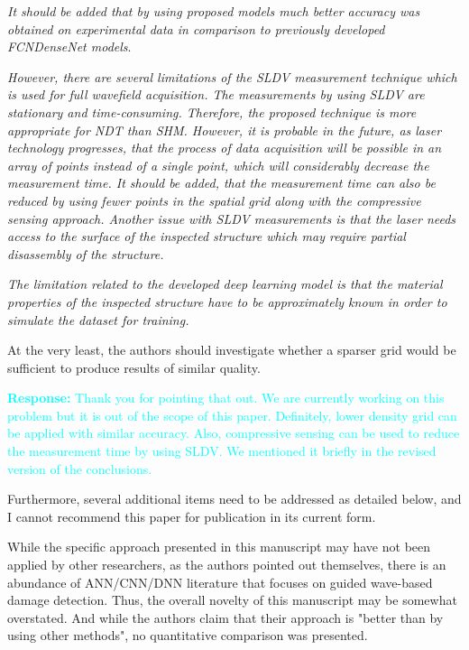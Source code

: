 \documentclass[11pt,a2paper]{report}
\begin{document}
   \emph{It should be added that by using proposed models much better accuracy was
obtained on experimental data in comparison to previously developed FCNDenseNet
models}.
   
   \emph{However, there are several limitations of the SLDV measurement technique which is used for full wavefield acquisition.
   The measurements by using SLDV are stationary and time-consuming.
   Therefore, the proposed technique is more appropriate for NDT than SHM.
   However, it is probable in the future, as
laser technology progresses, that the process of data acquisition will be possible in
an array of points instead of a single point, which will considerably decrease the measurement time.
   It should be added, that the measurement time can also be reduced by using fewer points in the spatial grid along with the compressive sensing approach.
   Another issue with SLDV measurements is that the laser needs access to the surface of the inspected structure which may require partial disassembly of the structure.
   }

	\emph{The limitation related to the developed deep learning model is that the material properties of the inspected structure have to be approximately known in order to simulate the dataset for training.} 
	
	\vspace{5mm}
   
	At the very least, the authors should investigate whether a sparser grid would be sufficient to produce results of similar quality. 
	
	\textcolor{Cyan}{
		\textbf{Response:}	
    Thank you for pointing that out. We are currently working on this problem but it is out of the scope of this paper. Definitely, lower density grid can be applied with similar accuracy. Also, compressive sensing can be used to reduce the measurement time by using SLDV. We mentioned it briefly in the revised version of the conclusions.
	}

	\vspace{5mm}

	Furthermore, several additional items need to be addressed as detailed below, and I cannot recommend this paper for publication in its current form.
	
	While the specific approach presented in this manuscript may have not been applied by other researchers, as the authors pointed out themselves, there is an abundance of ANN/CNN/DNN literature that focuses on guided wave-based damage detection. 
	Thus, the overall novelty of this manuscript may be somewhat overstated. And while the authors claim that their approach is "better than by using other methods", no quantitative comparison was presented. 
\end{document}
